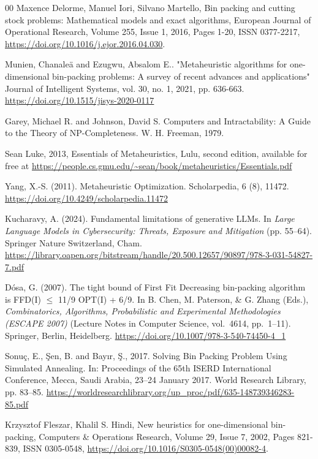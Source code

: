 \documentclass[11pt]{article}
\begin{document}
\begin{thebibliography}{00}
 Maxence Delorme, Manuel Iori, Silvano Martello, Bin packing and cutting stock problems: Mathematical models and exact algorithms, European Journal of Operational Research, Volume 255, Issue 1, 2016, Pages 1-20, ISSN 0377-2217, \url{https://doi.org/10.1016/j.ejor.2016.04.030}.

 Munien, Chanaleä and Ezugwu, Absalom E.. "Metaheuristic algorithms for one-dimensional bin-packing problems: A survey of recent advances and applications" Journal of Intelligent Systems, vol. 30, no. 1, 2021, pp. 636-663. \url{https://doi.org/10.1515/jisys-2020-0117}

 Garey, Michael R. and Johnson, David S. Computers and Intractability: A Guide to the Theory of NP-Completeness. W. H. Freeman, 1979.

 Sean Luke, 2013, Essentials of Metaheuristics, Lulu, second edition, available for free at \url{https://people.cs.gmu.edu/~sean/book/metaheuristics/Essentials.pdf}

 Yang, X.-S. (2011). Metaheuristic Optimization. Scholarpedia, 6 (8), 11472. \url{https://doi.org/10.4249/scholarpedia.11472}

 Kucharavy, A. (2024). Fundamental limitations of generative LLMs. In \textit{Large Language Models in Cybersecurity: Threats, Exposure and Mitigation} (pp. 55--64). Springer Nature Switzerland, Cham. \url{https://library.oapen.org/bitstream/handle/20.500.12657/90897/978-3-031-54827-7.pdf}

 D\'osa, G. (2007). The tight bound of First Fit Decreasing bin-packing algorithm is FFD(I) $\leq$ 11/9 OPT(I) + 6/9. In B. Chen, M. Paterson, \& G. Zhang (Eds.), \textit{Combinatorics, Algorithms, Probabilistic and Experimental Methodologies (ESCAPE 2007)} (Lecture Notes in Computer Science, vol.~4614, pp.~1--11). Springer, Berlin, Heidelberg. \url{https://doi.org/10.1007/978-3-540-74450-4\_1}

 Sonuç, E., Şen, B. and Bayır, Ş., 2017. Solving Bin Packing Problem Using Simulated Annealing. In: Proceedings of the 65th ISERD International Conference, Mecca, Saudi Arabia, 23–24 January 2017. World Research Library, pp. 83–85. \url{https://worldresearchlibrary.org/up\_proc/pdf/635-148739346283-85.pdf}

 Krzysztof Fleszar, Khalil S. Hindi, New heuristics for one-dimensional bin-packing, Computers \& Operations Research, Volume 29, Issue 7, 2002, Pages 821-839, ISSN 0305-0548, \url{https://doi.org/10.1016/S0305-0548(00)00082-4}.


\end{thebibliography}
\end{document}
